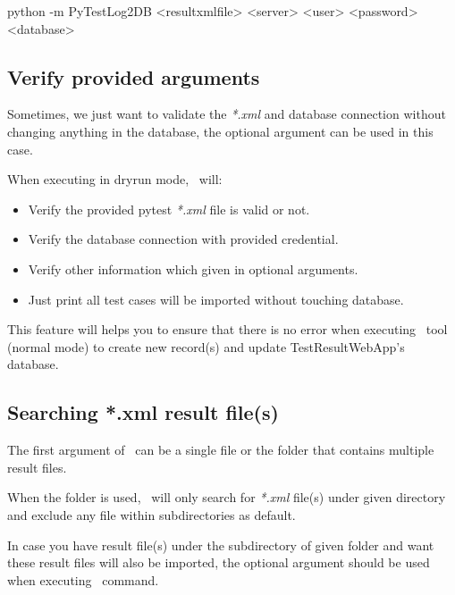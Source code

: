 \begin{robotlog}
python -m PyTestLog2DB <resultxmlfile> <server> <user> <password> <database>
\end{robotlog}

  \hypertarget{verify-provided-arguments}{%
  \subsection{Verify provided arguments}\label{verify-provided-arguments}}

    Sometimes, we just want to validate the \emph{*.xml} and database
    connection without changing anything in the database, the optional
    argument  can be used in this case.

    When executing in dryrun mode, \pkg\ will:

    \begin{itemize}
      \item
        Verify the provided pytest \emph{*.xml} file is valid or not.
      \item
        Verify the database connection with provided credential.
      \item
        Verify other information which given in optional arguments.
      \item
        Just print all test cases will be imported without touching database.
    \end{itemize}

    This feature will helps you to ensure that there is no error when
    executing \pkg\ tool (normal mode) to create new record(s) and
    update TestResultWebApp's database.

  \hypertarget{searching-.xml-result-files}{%
  \subsection{Searching *.xml result file(s)}}
  \label{searching-.xml-result-files}

    The first argument  of \pkg\ can be a single file or the
    folder that contains multiple result files.

    When the folder is used, \pkg\ will only search for \emph{*.xml} file(s)
    under given directory and exclude any file within subdirectories as default.

    In case you have result file(s) under the subdirectory of given folder and
    want these result files will also be imported, the optional argument
     should be used when executing \pkg\ command.

